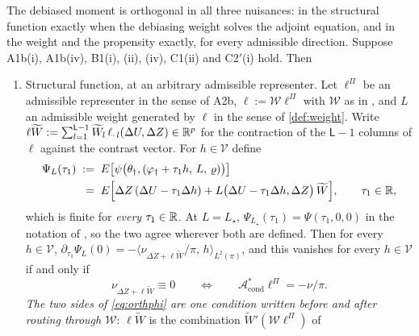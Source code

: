 \begin{proposition}\label{prp:orthog}
The debiased moment is orthogonal in all three nuisances: in the structural function exactly when the
debiasing weight solves the adjoint equation, and in the weight and the propensity exactly, for every
admissible direction.
Suppose A1b(i), A1b(iv), B1(i), (ii), (iv), C1(ii) and C2$'$(i) hold. Then
\begin{enumerate}
\item[(i)] Structural function, at an arbitrary admissible representer. Let $\ell^\Pi$ be an
admissible representer in the sense of A2b, $\ell:=\mathcal W\ell^\Pi$ with $\mathcal W$ as in
, and $L$ an admissible
weight generated by $\ell$ in the sense of \cref{def:weight}. Write
$\ell\widetilde W:=\sum_{l=1}^{\mathsf L-1}\widetilde W_l\,\ell_{\cdot\,l}(\Delta U,\Delta Z)\in\mathbb{R}^{p}$
for the contraction of the $\mathsf L-1$ columns of $\ell$ against the contrast vector. For
$h\in\mathcal V$ define
\begin{equation}\label{eq:PsiL}
\begin{split}
\Psi_L(\tau_1)\;&:=\;E\big[\psi\big(\theta_\dagger,(\varphi_{\dagger}+\tau_1h,\,L,\,\varrho)\big)\big] \\
&\;=\;E\Big[\Delta Z\,(\Delta U-\tau_1\Delta h)+L\big(\Delta U-\tau_1\Delta h,\Delta Z\big)\,\widetilde W\Big],
\qquad\tau_1\in\mathbb{R},
\end{split}
\end{equation}
which is finite for \emph{every} $\tau_1\in\mathbb{R}$. At $L=L_\star$,
$\Psi_{L_\star}(\tau_1)=\Psi(\tau_1,0,0)$ in the notation of , so the two agree
wherever both are defined. Then for every $h\in\mathcal V$,
$\partial_{\tau_1}\Psi_L(0)=-\big\langle\nu_{\Delta Z+\ell\widetilde W}/\pi,\,h\big\rangle_{L^{2}(\pi)}$,
and this vanishes for every $h\in\mathcal V$ if and only if
\begin{equation}\label{eq:orthphi}
\nu_{\Delta Z+\ell\widetilde W}\equiv0
\qquad\Longleftrightarrow\qquad
\mathcal A^\ast_{\mathrm{cond}}\ell^\Pi=-\nu/\pi .
\end{equation}
\emph{The two sides of \eqref{eq:orthphi} are one condition written before and after routing through
$\mathcal W$}: $\ell\widetilde W$ is the combination $\widetilde W'(\mathcal W\ell^\Pi)$ of

\end{enumerate}
\end{proposition}
